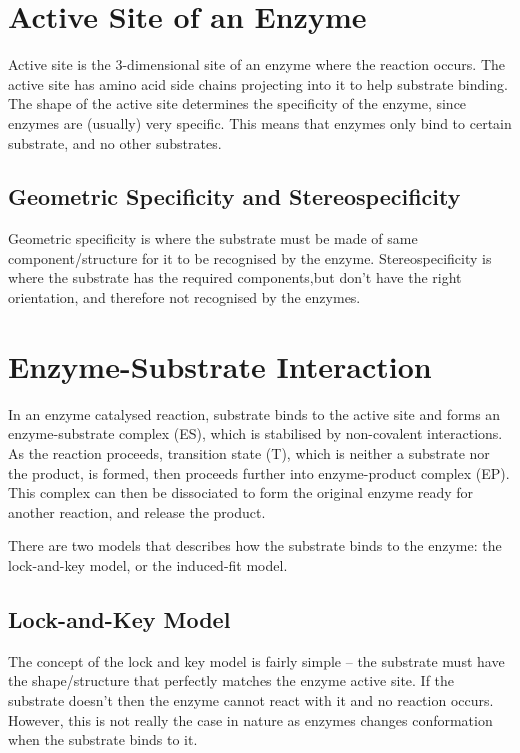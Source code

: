 \documentclass[a4paper, 12pt]{report}
\begin{document}
\section{Active Site of an Enzyme}

Active site is the 3-dimensional site of an enzyme where the reaction occurs.
The active site has amino acid side chains projecting into it to help substrate binding.
The shape of the active site determines the specificity of the enzyme, since enzymes are (usually) very specific.
This means that enzymes only bind to certain substrate, and no other substrates.

\subsection{Geometric Specificity and Stereospecificity}

Geometric specificity is where the substrate must be made of same component/structure for it to be recognised by the enzyme.
Stereospecificity is where the substrate has the required components,but don't have the right orientation, and therefore not recognised by the enzymes.

\section{Enzyme-Substrate Interaction}

\begin{center}
\end{center}

In an enzyme catalysed reaction, substrate binds to the active site and forms an enzyme-substrate complex (ES), which is stabilised by non-covalent interactions.
As the reaction proceeds, transition state (T), which is neither a substrate nor the product, is formed, then proceeds further into enzyme-product complex (EP).
This complex can then be dissociated to form the original enzyme ready for another reaction, and release the product.

There are two models that describes how the substrate binds to the enzyme: the lock-and-key model, or the induced-fit model.

\subsection{Lock-and-Key Model}

The concept of the lock and key model is fairly simple -- the substrate must have the shape/structure that perfectly matches the enzyme active site.
If the substrate doesn't then the enzyme cannot react with it and no reaction occurs.
However, this is not really the case in nature as enzymes changes conformation when the substrate binds to it.
\end{document}

